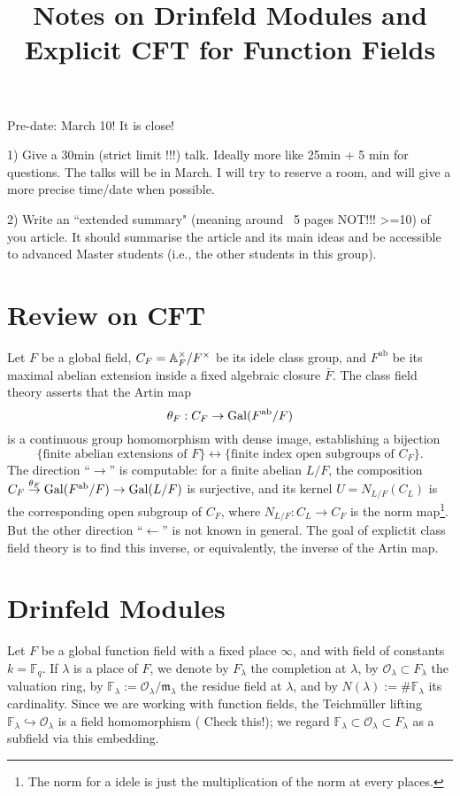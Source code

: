 \documentclass{article}
\title{Notes on Drinfeld Modules and Explicit CFT for Function Fields}
\newcommand{\F}{\mathbb{F}}
\renewcommand{\O}{\mathcal{O}}
\newcommand{\m}{\mathfrak{m}}
\newcommand{\ab}{\mathrm{ab}}
\begin{document}
\maketitle

Pre-date: March 10! It is close!

1) Give a 30min (strict limit !!!) talk. Ideally more like 25min + 5 min for questions.  The talks will be in March. I will try to reserve a room, and will give a more precise time/date when possible.

2) Write an ``extended summary" (meaning around ~5 pages NOT!!! >=10) of you article. It should summarise the article and its main ideas and be accessible to advanced Master students (i.e., the other students in this group).

\section{Review on CFT}
Let $F$ be a global field, $C_F = \mathbb{A}_F^\times/F^\times$ be its idele class group, and $F^\ab$ be its maximal abelian extension inside a fixed algebraic closure $\bar F$.
The class field theory asserts that the Artin map
\[\theta_F : C_F\to\gal(F^\ab/F)\]
is a continuous group homomorphism with dense image,
establishing a bijection
\[\{\text{finite abelian extensions of }F\}\longleftrightarrow \{\text{finite index open subgroups of }C_F\}.\]
The direction ``$\to$'' is computable: for a finite abelian $L/F$,
the composition $C_F\stackrel{\theta_F}{\to}\gal(F^\ab/F)\to\gal(L/F)$ is surjective,
and its kernel $U = N_{L/F}(C_L)$ is the corresponding open subgroup of $C_F$, where $N_{L/F} : C_L\to C_F$ is the norm map\footnote{
    The norm for a idele is just the multiplication of the norm at every places.}.
But the other direction ``$\gets$'' is not known in general.
The goal of explictit class field theory is to find this inverse, or equivalently, the inverse of the Artin map.


\section{Drinfeld Modules}
Let $F$ be a global function field with a fixed place $\infty$, and with field of constants $k = \F_q$.
If $\lambda$ is a place of $F$,
we denote by $F_\lambda$ the completion at $\lambda$,  by $\O_\lambda\subset F_\lambda$ the valuation ring,
by $\F_\lambda := \O_\lambda/\m_\lambda$ the residue field at $\lambda$,
and by $N(\lambda) := \#\F_\lambda$ its cardinality.
Since we are working with function fields, the Teichm\"uller lifting $\F_\lambda\hookrightarrow \O_\lambda$ is a field homomorphism ({\color{red} Check this!});
we regard $\F_\lambda\subset\O_\lambda\subset F_\lambda$ as a subfield via this embedding.
\end{document}
